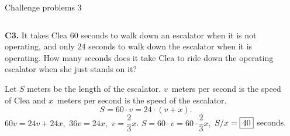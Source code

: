\documentclass[9pt,aspectratio=169]{beamer}
\begin{document}
\begin{frame}{Challenge problems 3}
  \begin{columns}[T]
    \begin{column}{0.5\textwidth}
      \begin{problem}
        \textbf{C3.} It takes Clea $60$ seconds to walk down an escalator when it is not operating, and only $24$ seconds to walk down the escalator when it is operating. How many seconds does it take Clea to ride down the operating escalator when she just stands on it?
      \end{problem}
      Let $S$ meters be the length of the escalator. $v$~meters per second is the speed of Clea and $x$~meters per second is the speed of the escalator.
      \[ S = 60 \cdot v = 24 \cdot (v + x). \] 
      $60 v = 24 v + 24 x,$ $36 v = 24 x,$ $v = \dfrac{2}{3}x$.
      $ S = 60 \cdot v = 60 \cdot \dfrac{2}{3} x,$ $S/x = \fbox{40}$ seconds.
    \end{column}
    \begin{column}{0.5\textwidth}
    \end{column}
  \end{columns}
\end{frame}
\end{document}
